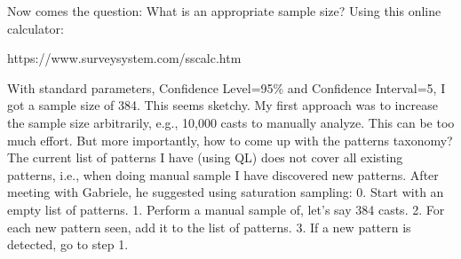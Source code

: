 Now comes the question: What is an appropriate sample size?
Using this online calculator:

https://www.surveysystem.com/sscalc.htm

With standard parameters, Confidence Level=95\% and Confidence Interval=5,
I got a sample size of 384.
This seems sketchy.
My first approach was to increase the sample size arbitrarily,
e.g., 10,000 casts to manually analyze.
This can be too much effort.
But more importantly, how to come up with the patterns taxonomy?
The current list of patterns I have (using QL) does not cover all
existing patterns, i.e.,
when doing manual sample I have discovered new patterns.
After meeting with Gabriele, he suggested using saturation sampling:
0. Start with an empty list of patterns.
1. Perform a manual sample of, let’s say 384 casts.
2. For each new pattern seen, add it to the list of patterns.
3. If a new pattern is detected, go to step 1.
